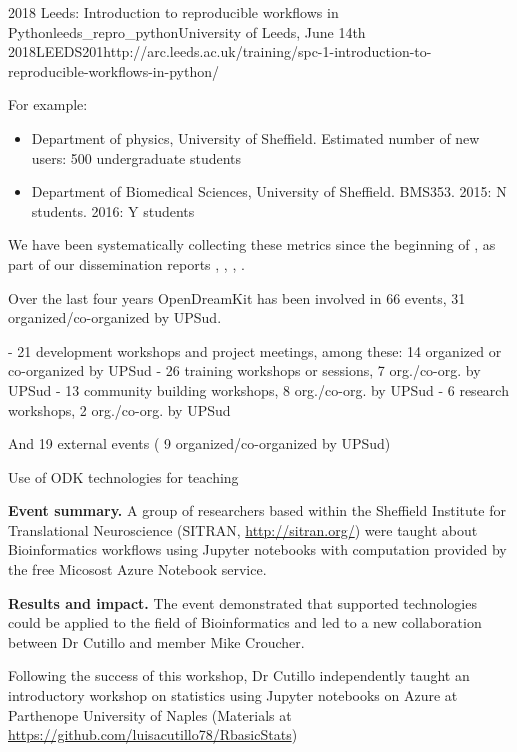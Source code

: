 \begin{Aim 1}
\begin{Aim 2}
\begin{event}{2018 Leeds: Introduction to reproducible workflows in Python}{leeds_repro_python}{University of Leeds, June 14th 2018}{LEEDS}{20}{1}{http://arc.leeds.ac.uk/training/spc-1-introduction-to-reproducible-workflows-in-python/}
\begin{itemize}
\begin{itemize}
  For example:
  \begin{itemize}
  \item Department of physics, University of Sheffield. Estimated
    number of new users: 500 undergraduate students
  \item Department of Biomedical Sciences, University of Sheffield.
    BMS353. 2015: N students. 2016: Y students
  \end{itemize}
\end{itemize}

We have been systematically collecting these metrics since the
beginning of \ODK, as part of our dissemination reports
, ,
, .

Over the last four years OpenDreamKit has been involved in 66 events, 31 organized/co-organized by UPSud.

                        - 21 development workshops and project meetings, among these: 14 organized or co-organized by UPSud
                        - 26 training workshops or sessions,  7 org./co-org. by UPSud
                        - 13 community building workshops, 8 org./co-org. by UPSud
                        - 6 research workshops, 2 org./co-org. by UPSud

And 19 external events ( 9 organized/co-organized by UPSud) 


















Use of ODK technologies for teaching

\textbf{Event summary.} A group of researchers based within the Sheffield Institute for Translational Neuroscience (SITRAN, \url{http://sitran.org/}) were taught about Bioinformatics workflows using Jupyter notebooks with computation provided by the free Micosost Azure Notebook service.

\textbf{Results and impact.} The event demonstrated that \ODK supported technologies could be applied to the field of Bioinformatics and led to a new collaboration between Dr Cutillo and \ODK member Mike Croucher.

Following the success of this workshop, Dr Cutillo independently taught an introductory workshop on statistics using Jupyter notebooks on Azure at Parthenope University of Naples (Materials at \url{https://github.com/luisacutillo78/RbasicStats})


\end{itemize}
\end{event}
\end{Aim 2}
\end{Aim 1}
